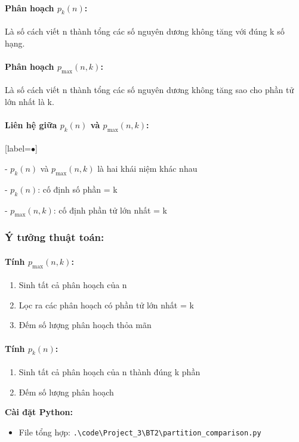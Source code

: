 \documentclass[12pt,a4paper]{article}
\begin{document}
\paragraph{Phân hoạch $p_k(n)$:}
Là số cách viết n thành tổng các số nguyên dương không tăng với đúng k số hạng.

\paragraph{Phân hoạch $p_{\max}(n, k)$:}
Là số cách viết n thành tổng các số nguyên dương không tăng sao cho phần tử lớn nhất là k.

\paragraph{Liên hệ giữa $p_k(n)$ và $p_{\max}(n, k)$:}
[label=$\bullet$]
    
- $p_k(n)$ và $p_{\max}(n, k)$ là hai khái niệm khác nhau
    
- $p_k(n)$: cố định số phần = k
    
- $p_{\max}(n, k)$: cố định phần tử lớn nhất = k


\subsubsection*{Ý tưởng thuật toán:}

\paragraph{Tính $p_{\max}(n, k)$:}
\begin{enumerate}
    \item Sinh tất cả phân hoạch của n
    \item Lọc ra các phân hoạch có phần tử lớn nhất = k
    \item Đếm số lượng phân hoạch thỏa mãn
\end{enumerate}

\paragraph{Tính $p_k(n)$:}
\begin{enumerate}
    \item Sinh tất cả phân hoạch của n thành đúng k phần
    \item Đếm số lượng phân hoạch
\end{enumerate}

\textbf{Cài đặt Python:}
\begin{itemize}[label=\textbullet]
   \item File tổng hợp: \texttt{.\textbackslash code\textbackslash Project\_3\textbackslash BT2\textbackslash partition\_comparison.py}
\end{itemize}
\end{document}
